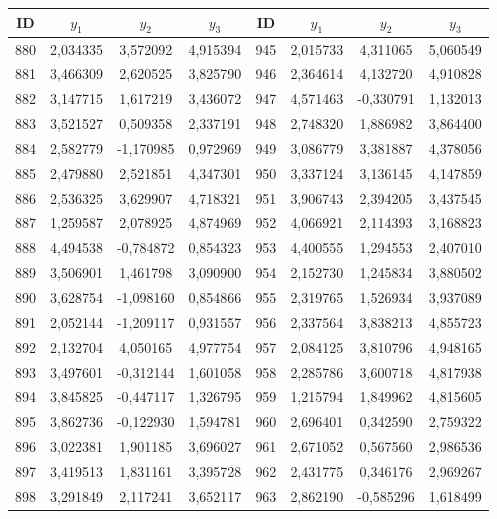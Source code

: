 \begin{apendicesenv}
\begin{table}[H]
	\centering
	\scriptsize
	\begin{tabular}{c c c c c c c c}
		\toprule
		 \centering \textbf{ID} & $y_1$ & $y_2$ & $y_3$ & \textbf{ID} & $y_1$ & $y_2$ & $y_3$ \\
		\midrule
		880 & 2,034335 & 3,572092 & 4,915394 & 945 & 2,015733 & 4,311065 & 5,060549 \\
		881 & 3,466309 & 2,620525 & 3,825790 & 946 & 2,364614 & 4,132720 & 4,910828 \\
		882 & 3,147715 & 1,617219 & 3,436072 & 947 & 4,571463 & -0,330791 & 1,132013 \\
		883 & 3,521527 & 0,509358 & 2,337191 & 948 & 2,748320 & 1,886982 & 3,864400 \\
		884 & 2,582779 & -1,170985 & 0,972969 & 949 & 3,086779 & 3,381887 & 4,378056 \\
		885 & 2,479880 & 2,521851 & 4,347301 & 950 & 3,337124 & 3,136145 & 4,147859 \\
		886 & 2,536325 & 3,629907 & 4,718321 & 951 & 3,906743 & 2,394205 & 3,437545 \\
		887 & 1,259587 & 2,078925 & 4,874969 & 952 & 4,066921 & 2,114393 & 3,168823 \\
		888 & 4,494538 & -0,784872 & 0,854323 & 953 & 4,400555 & 1,294553 & 2,407010 \\
		889 & 3,506901 & 1,461798 & 3,090900 & 954 & 2,152730 & 1,245834 & 3,880502 \\
		890 & 3,628754 & -1,098160 & 0,854866 & 955 & 2,319765 & 1,526934 & 3,937089 \\
		891 & 2,052144 & -1,209117 & 0,931557 & 956 & 2,337564 & 3,838213 & 4,855723 \\
		892 & 2,132704 & 4,050165 & 4,977754 & 957 & 2,084125 & 3,810796 & 4,948165 \\
		893 & 3,497601 & -0,312144 & 1,601058 & 958 & 2,285786 & 3,600718 & 4,817938 \\
		894 & 3,845825 & -0,447117 & 1,326795 & 959 & 1,215794 & 1,849962 & 4,815605 \\
		895 & 3,862736 & -0,122930 & 1,594781 & 960 & 2,696401 & 0,342590 & 2,759322 \\
		896 & 3,022381 & 1,901185 & 3,696027 & 961 & 2,671052 & 0,567560 & 2,986536 \\
		897 & 3,419513 & 1,831161 & 3,395728 & 962 & 2,431775 & 0,346176 & 2,969267 \\
		898 & 3,291849 & 2,117241 & 3,652117 & 963 & 2,862190 & -0,585296 & 1,618499 \\

\end{tabular}
\end{table}
\end{apendicesenv}
